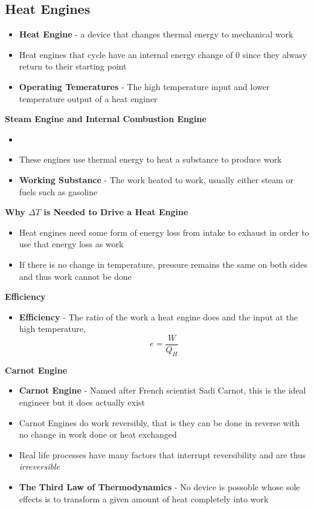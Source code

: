 \subsection{Heat Engines}
\begin{itemize}
    \item \textbf{Heat Engine} - a device that changes thermal energy to mechanical work
    \item Heat engines that cycle have an internal energy change of 0 since they alwasy return to their starting point
    \item \textbf{Operating Temeratures} - The high temperature input and lower temperature output of a heat enginer
\end{itemize}

\textbf{Steam Engine and Internal Combustion Engine}
\begin{itemize}
    \item \item These engines use thermal energy to heat a substance to produce work
    \item \textbf{Working Substance} - The work heated to work, usually either steam or fuels such as gasoline
\end{itemize}

\textbf{Why \(\Delta T\) is Needed to Drive a Heat Engine}
\begin{itemize}
    \item Heat engines need some form of energy loss from intake to exhaust in order to use that energy loss as work
    \item If there is no change in temperature, pressure remains the same on both sides and thus work cannot be done
\end{itemize}

\textbf{Efficiency}
\begin{itemize}
    \item \textbf{Efficiency} - The ratio of the work a heat engine does and the input at the high temperature, \[e=\frac{W}{Q_H}\]
\end{itemize}

\textbf{Carnot Engine}
\begin{itemize}
    \item \textbf{Carnot Engine} - Named after French scientist Sadi Carnot, this is the ideal engineer but it does actually exist
    \item Carnot Engines do work reversibly, that is they can be done in reverse with no change in work done or heat exchanged
    \item Real life processes have many factors that interrupt reversibility and are thus \emph{irreversible}
    \item \textbf{The Third Law of Thermodynamics} - No device is possoble whose sole effects is to transform a given amount of heat completely into work
\end{itemize}

